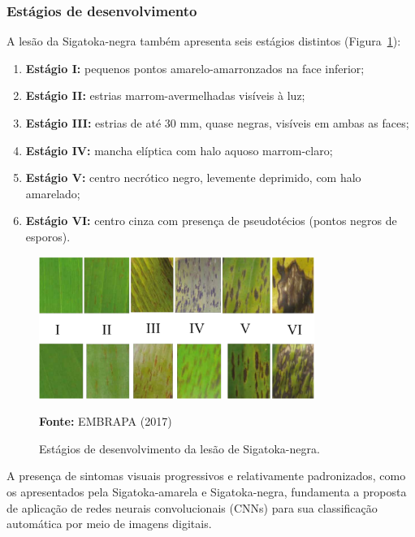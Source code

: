 \subsubsection*{Estágios de desenvolvimento}

A lesão da Sigatoka-negra também apresenta seis estágios distintos (Figura~\ref{fig:sigatoka_negra_estagios}):

\begin{enumerate}
    \item \textbf{Estágio I:} pequenos pontos amarelo-amarronzados na face inferior;
    \item \textbf{Estágio II:} estrias marrom-avermelhadas visíveis à luz;
    \item \textbf{Estágio III:} estrias de até 30 mm, quase negras, visíveis em ambas as faces;
    \item \textbf{Estágio IV:} mancha elíptica com halo aquoso marrom-claro;
    \item \textbf{Estágio V:} centro necrótico negro, levemente deprimido, com halo amarelado;
    \item \textbf{Estágio VI:} centro cinza com presença de pseudotécios (pontos negros de esporos).
\end{enumerate}

\begin{figure}[h]
    \centering
    \includegraphics[width=0.8\textwidth]{figuras/capitulo 3/estagios da doenca.png}
    \caption{Estágios de desenvolvimento da lesão de Sigatoka-negra.}
    \label{fig:sigatoka_negra_estagios}
    \small{\textbf{Fonte:} EMBRAPA (2017)}
\end{figure}

\vspace{1em}
A presença de sintomas visuais progressivos e relativamente padronizados, como os apresentados pela Sigatoka-amarela e Sigatoka-negra, fundamenta a proposta de aplicação de redes neurais convolucionais (CNNs) para sua classificação automática por meio de imagens digitais.



